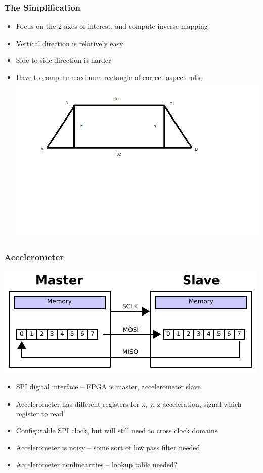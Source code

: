 \documentclass{beamer}
\begin{document}
\begin{frame}
\frametitle{The Simplification}
\begin{itemize}
\item Focus on the 2 axes of interest, and compute inverse mapping
\item Vertical direction is relatively easy
\item Side-to-side direction is harder
\pause
\item Have to compute maximum rectangle of correct aspect ratio
\includegraphics[height=0.7\textheight]{./img/rectangle_in_trapezoid.png}
\end{itemize}
\end{frame}

\begin{frame}
\frametitle{Accelerometer}
\includegraphics[scale=0.4]{img/spi}
\begin{itemize}
\item SPI digital interface -- FPGA is master, accelerometer slave
\item Accelerometer has different registers for x, y, z acceleration, signal which register to read
\item Configurable SPI clock, but will still need to cross clock domains
\item Accelerometer is noisy -- some sort of low pass filter needed
\item Accelerometer nonlinearities -- lookup table needed?
\end{itemize}
\end{frame}
\end{document}
